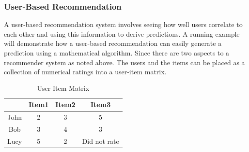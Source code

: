 \subsubsection{User‐Based Recommendation}
A user-based recommendation system involves seeing how well users correlate to each other and using this information to derive predictions. A running example will demonstrate how a user-based recommendation can easily generate a prediction using a mathematical algorithm.
Since there are two aspects to a recommender system as noted above. The users and the items can be placed as a collection of numerical ratings into a user-item matrix.\\
\begin{table}[ht]
\caption{User Item Matrix} %
\centering  %
\begin{tabular}{c c c c} %
\hline\hline                        %
 & Item1 & Item2& Item3 \\ [0.5ex] %
\hline                  %

John & 2 & 3  & 5  \\
Bob & 3 & 4 & 3 \\
Lucy & 5 & 2& Did not rate \\[1ex]      %
\hline %
\end{tabular}
\label{table:3} %
\end{table}

